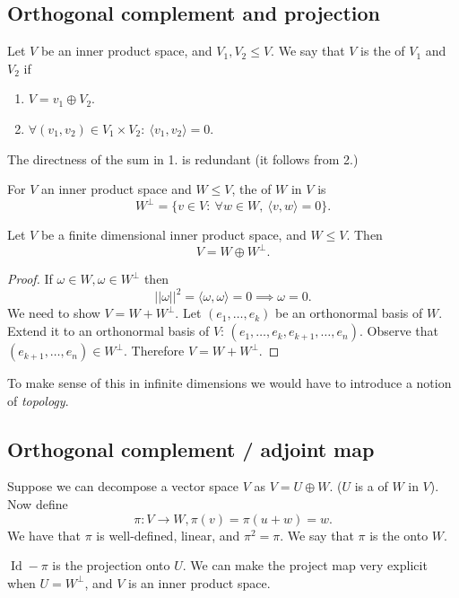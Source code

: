 \documentclass[a4paper]{scrartcl}
\begin{document}
\subsection{Orthogonal complement and projection}
\begin{definition}
      Let $V$ be an inner product space, and $V_1, V_2 \leq V$. We say that $V$ is the  of $V_1$ and $V_2$ if 
      \begin{enumerate}
           \item $V=v_1 \oplus V_2$.
           \item $\forall (v_1,v_2) \in V_1 \times V_2: \ \langle v_1 ,v_2 \rangle =0 $.
      \end{enumerate}
\end{definition}
\begin{remark}
      The directness of the sum in 1. is redundant (it follows from 2.)
\end{remark}
\begin{definition}
      For $V$ an inner product space and $W \leq V$, the  of $W$ in $V$ is 
      \[W^{\perp}=\{v \in V: \ \forall w \in W, \ \langle v,w \rangle =0 \}.\]
\end{definition}

\begin{lemma}
      Let $V$ be a finite dimensional inner product space, and $W \leq V$. Then 
      \[V=W \oplus W^{\perp}.\]
\end{lemma}
\begin{proof}
     If $\omega \in W, \omega \in W^\perp$ then 
     \[||\omega||^2=\langle \omega,\omega \rangle  =0 \implies \omega=0.\]
     We need to show $V=W+W^\perp$. Let $\left(e_1, \ldots ,e_k\right)$ be an orthonormal basis of $W$. Extend it to an orthonormal basis of $V$: $(e_1,\ldots ,e_k, e_{k+1},\ldots ,e_n)$. Observe that $(e_{k+1},\ldots ,e_n)\in W^\perp$. Therefore $V=W+W^\perp$.
\end{proof}
\begin{remark}
      To make sense of this in infinite dimensions we would have to introduce a notion of \emph{topology}.
\end{remark}
\subsection{Orthogonal complement / adjoint map}
\begin{definition}
     Suppose we can decompose a vector space $V$ as $V=U \oplus W$. ($U$ is a  of $W$ in $V$). Now define 
     \[\pi: V \rightarrow W, \pi(v)=\pi(u+w)=w.\]
     We have that $\pi$ is well-defined, linear, and $\pi^2=\pi$. We say that $\pi$ is the  onto $W$.
\end{definition}
\begin{remark}
     $\operatorname{Id}-\pi$ is the projection onto $U$. We can make the project map very explicit when $U=W^\perp$, and $V$ is an inner product space.
\end{remark}
\end{document}
